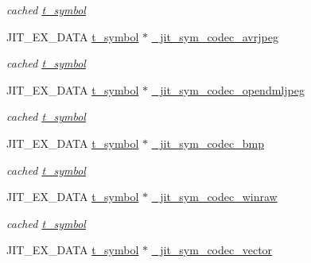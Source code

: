 \begin{DoxyCompactItemize}
\begin{DoxyCompactList}\small\item\em cached \hyperlink{structt__symbol}{t\_\-symbol} \item\end{DoxyCompactList}\item 
\hypertarget{group__jitter_ga636e00d9ed9e7ad41a0ab953268cda5e}{
JIT\_\-EX\_\-DATA \hyperlink{structt__symbol}{t\_\-symbol} $\ast$ \hyperlink{group__jitter_ga636e00d9ed9e7ad41a0ab953268cda5e}{\_\-jit\_\-sym\_\-codec\_\-avrjpeg}}
\label{group__jitter_ga636e00d9ed9e7ad41a0ab953268cda5e}

\begin{DoxyCompactList}\small\item\em cached \hyperlink{structt__symbol}{t\_\-symbol} \item\end{DoxyCompactList}\item 
\hypertarget{group__jitter_ga9252e9079690343ae441d22fe55dc3ac}{
JIT\_\-EX\_\-DATA \hyperlink{structt__symbol}{t\_\-symbol} $\ast$ \hyperlink{group__jitter_ga9252e9079690343ae441d22fe55dc3ac}{\_\-jit\_\-sym\_\-codec\_\-opendmljpeg}}
\label{group__jitter_ga9252e9079690343ae441d22fe55dc3ac}

\begin{DoxyCompactList}\small\item\em cached \hyperlink{structt__symbol}{t\_\-symbol} \item\end{DoxyCompactList}\item 
\hypertarget{group__jitter_gac1b1fc063bc5e142e40abeceacf365b3}{
JIT\_\-EX\_\-DATA \hyperlink{structt__symbol}{t\_\-symbol} $\ast$ \hyperlink{group__jitter_gac1b1fc063bc5e142e40abeceacf365b3}{\_\-jit\_\-sym\_\-codec\_\-bmp}}
\label{group__jitter_gac1b1fc063bc5e142e40abeceacf365b3}

\begin{DoxyCompactList}\small\item\em cached \hyperlink{structt__symbol}{t\_\-symbol} \item\end{DoxyCompactList}\item 
\hypertarget{group__jitter_ga338bb45421a2c586d8ec57af1550f956}{
JIT\_\-EX\_\-DATA \hyperlink{structt__symbol}{t\_\-symbol} $\ast$ \hyperlink{group__jitter_ga338bb45421a2c586d8ec57af1550f956}{\_\-jit\_\-sym\_\-codec\_\-winraw}}
\label{group__jitter_ga338bb45421a2c586d8ec57af1550f956}

\begin{DoxyCompactList}\small\item\em cached \hyperlink{structt__symbol}{t\_\-symbol} \item\end{DoxyCompactList}\item 
\hypertarget{group__jitter_ga260fe083d60559670bfa2c9e3c77257f}{
JIT\_\-EX\_\-DATA \hyperlink{structt__symbol}{t\_\-symbol} $\ast$ \hyperlink{group__jitter_ga260fe083d60559670bfa2c9e3c77257f}{\_\-jit\_\-sym\_\-codec\_\-vector}}
\label{group__jitter_ga260fe083d60559670bfa2c9e3c77257f}


\end{DoxyCompactItemize}
